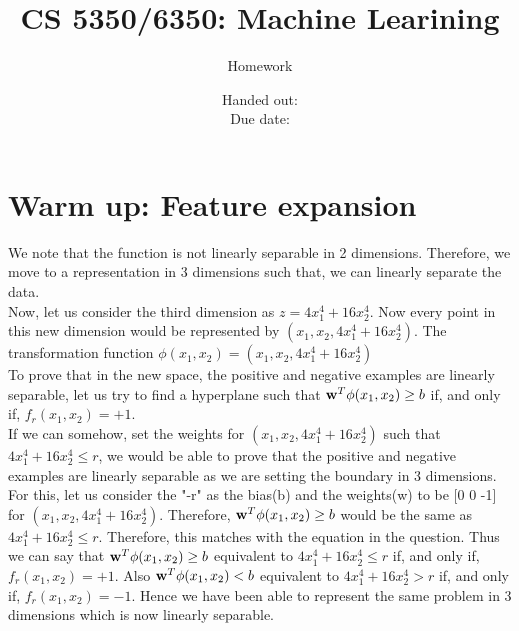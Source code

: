 \documentclass[12pt, fullpage,letterpaper]{article}
\title{CS 5350/6350: Machine Learining \semester}
\author{Homework \assignmentId}
\date{Handed out: \releaseDate\\
  Due date: \dueDate}
\newcommand{\bw}{{\bf w}}
\begin{document}
\maketitle

\section{Warm up: Feature expansion}
We note that the function is not linearly separable in 2 dimensions. Therefore, we move to a representation in 3 dimensions such that, we can linearly separate the data.\\
Now, let us consider the third dimension as $z=4x_1^4 + 16x_2^4$. Now every point in this new dimension would be represented by $(x_1,x_2,4x_1^4 + 16x_2^4)$. The transformation function $\phi(x_1, x_2)=(x_1,x_2,4x_1^4 + 16x_2^4)$\\
To prove that in the new space, the positive and negative examples are linearly separable, let us try to find a hyperplane such that  $\bw^T\phi(x_1, x_2) \geq b$ if, and only if,
$f_r(x_1, x_2) = +1$.\\
If we can somehow, set the weights for $(x_1,x_2,4x_1^4 + 16x_2^4)$ such that $4x_1^4 + 16x_2^4 \leq r$, we would be able to prove that the positive and negative examples are linearly separable as we are setting the boundary in 3 dimensions.\\
For this, let us consider the "-r" as the bias(b) and the weights(w) to be [0  0 -1] for $(x_1,x_2,4x_1^4 + 16x_2^4)$. Therefore, $\bw^T\phi(x_1, x_2) \geq b$ would be the same as $4x_1^4 + 16x_2^4 \leq r$. Therefore, this matches with the equation in the question. 
Thus we can say that $\bw^T\phi(x_1, x_2) \geq b$  equivalent to $4x_1^4 + 16x_2^4 \leq r$ if, and only if,
$f_r(x_1, x_2) = +1$. Also $\bw^T\phi(x_1, x_2) < b$ equivalent to $4x_1^4 + 16x_2^4 > r$ if, and only if,
$f_r(x_1, x_2) = -1$.  Hence we have been able to represent the same problem in 3 dimensions which is now linearly separable.
\end{document}
